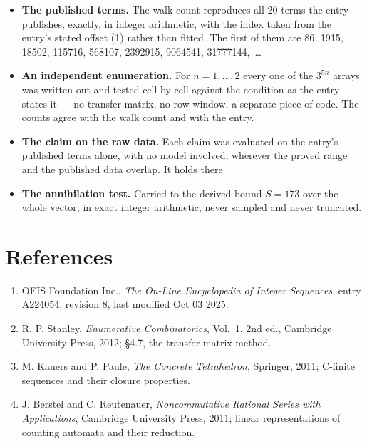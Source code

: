 \documentclass[11pt]{article}
\theoremstyle{definition}
\begin{document}
\begin{itemize}

\item {\bfseries The published terms.} The walk count reproduces all 20 terms the entry publishes, exactly, in integer arithmetic, with the index taken from the entry's stated offset (1) rather than fitted. The first of them are 86, 1915, 18502, 115716, 568107, 2392915, 9064541, 31777144,~\dots

\item {\bfseries An independent enumeration.} For $n = 1,\dots,2$ every one of the $3^{5n}$ arrays was written out and tested cell by cell against the condition as the entry states it --- no transfer matrix, no row window, a separate piece of code. The counts agree with the walk count and with the entry.

\item {\bfseries The claim on the raw data.} Each claim was evaluated on the entry's published terms alone, with no model involved, wherever the proved range and the published data overlap. It holds there.

\item {\bfseries The annihilation test.} Carried to the derived bound $S = 173$ over the whole vector, in exact integer arithmetic, never sampled and never truncated.

\end{itemize}

\section{References}

\begin{enumerate}

\item OEIS Foundation Inc., \emph{The On-Line Encyclopedia of Integer Sequences}, entry \href{https://oeis.org/A224054}{A224054}, revision 8, last modified Oct 03 2025.

\item R. P. Stanley, \emph{Enumerative Combinatorics}, Vol.~1, 2nd ed., Cambridge University Press, 2012; \S4.7, the transfer-matrix method.

\item M. Kauers and P. Paule, \emph{The Concrete Tetrahedron}, Springer, 2011; C-finite sequences and their closure properties.

\item J. Berstel and C. Reutenauer, \emph{Noncommutative Rational Series with Applications}, Cambridge University Press, 2011; linear representations of counting automata and their reduction.

\end{enumerate}
\end{document}
